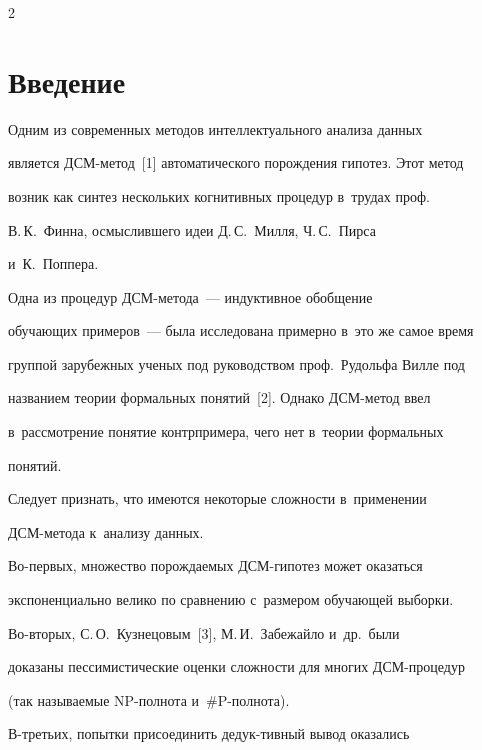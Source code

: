 \begin{multicols}{2}



\label{st\stat}



\section{Введение}



    Одним из современных методов интеллектуального анализа данных 

является ДСМ-ме\-тод~[1] автоматического порождения гипотез. Этот метод 

возник как синтез нескольких когнитивных процедур в~трудах проф.\ 

В.\,К.~Финна, осмыслившего идеи Д.\,С.~Милля, Ч.\,С.~Пирса 

и~К.~Поппера.

    

    Одна из процедур ДСМ-ме\-то\-да~--- индуктивное обобщение 

обучающих примеров~--- была исследована примерно в~это же самое время 

группой зарубежных ученых под руководством проф.\ Рудольфа Вилле под 

названием теории формальных понятий~[2]. Однако ДСМ-ме\-тод ввел 

в~рас\-смот\-ре\-ние понятие контрпримера, чего нет в~теории формальных 

понятий.

    

    Следует признать, что имеются некоторые сложности в~применении 

ДСМ-ме\-то\-да к~анализу данных.

    

    Во-первых, множество порождаемых ДСМ-ги\-по\-тез может оказаться 

экспоненциально велико по сравнению с~размером обучающей выборки.

    

    Во-вторых, С.\,О.~Кузнецовым~[3], М.\,И.~Забежайло и~др.\ были 

доказаны пессимистические оценки сложности для многих ДСМ-про\-це\-дур 

(так называемые NP-пол\-но\-та и~\#P-пол\-но\-та).

    

    В-третьих, попытки присоединить де\-дук-\linebreak тивный вывод оказались 


\end{multicols}
